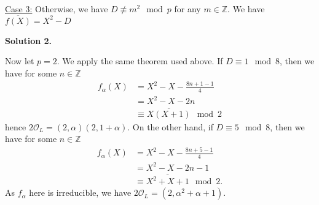 \documentclass[a4paper]{article}
\theoremstyle{definition}
\begin{document}
\bigskip

\noindent \underline{Case 3:} Otherwise, we have \(D \not\equiv m^2 \mod{p}\) for any \(m \in \mathbb{Z}\). We have \(\overline{f(X)} = X^2 - D\)

\bigskip

\noindent \textbf{Solution 2.}

\noindent Now let \(p = 2\). We apply the same theorem used above. If \(D \equiv 1 \mod{8}\), then we have for some \(n \in \mathbb{Z}\)
\begin{align}
    f_\alpha(X) &= X^2 - X - \frac{8n + 1 - 1}{4} \\
    &= X^2 - X - 2n \\
    &\equiv \overline{X(X +  1)} \mod{2}
\end{align}
hence \(2\mathcal{O}_L = (2, \alpha) (2, 1 + \alpha)\). On the other hand, if \(D \equiv 5 \mod{8}\), then we have for some \(n \in \mathbb{Z}\)
\begin{align}
    f_\alpha(X) &= X^2 - X - \frac{8n + 5 - 1}{4} \\
    &= X^2 - X - 2n - 1 \\
    &\equiv \overline{X^2 + X + 1} \mod{2} \text{.}
\end{align}
As \(f_\alpha\) here is irreducible, we have \(2 \mathcal{O}_L = (2, \alpha^2 + \alpha + 1)\).
\end{document}
